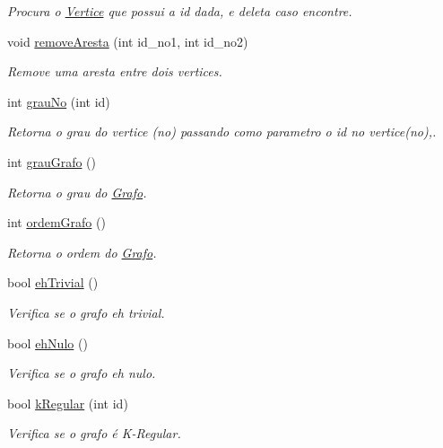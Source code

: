 \begin{DoxyCompactItemize}
\begin{DoxyCompactList}\small\item\em Procura o \hyperlink{class_vertice}{Vertice} que possui a id dada, e deleta caso encontre. \end{DoxyCompactList}\item 
void \hyperlink{class_grafo_ab3a5abe0a30afac753120ce1587f6f65}{remove\-Aresta} (int id\-\_\-no1, int id\-\_\-no2)
\begin{DoxyCompactList}\small\item\em Remove uma aresta entre dois vertices. \end{DoxyCompactList}\item 
int \hyperlink{class_grafo_a41ffeb7e79cf0d0c10297953f647c42d}{grau\-No} (int id)
\begin{DoxyCompactList}\small\item\em Retorna o grau do vertice (no) passando como parametro o id no vertice(no),. \end{DoxyCompactList}\item 
int \hyperlink{class_grafo_abada775efe72203e59e7930a095cbe95}{grau\-Grafo} ()
\begin{DoxyCompactList}\small\item\em Retorna o grau do \hyperlink{class_grafo}{Grafo}. \end{DoxyCompactList}\item 
int \hyperlink{class_grafo_ad954ce5924126084991e57a4e62a140f}{ordem\-Grafo} ()
\begin{DoxyCompactList}\small\item\em Retorna o ordem do \hyperlink{class_grafo}{Grafo}. \end{DoxyCompactList}\item 
bool \hyperlink{class_grafo_af70414fca091d884dd3d2656bdc790a9}{eh\-Trivial} ()
\begin{DoxyCompactList}\small\item\em Verifica se o grafo eh trivial. \end{DoxyCompactList}\item 
bool \hyperlink{class_grafo_a843e8d52e587e7564b4db61c8e3856e8}{eh\-Nulo} ()
\begin{DoxyCompactList}\small\item\em Verifica se o grafo eh nulo. \end{DoxyCompactList}\item 
bool \hyperlink{class_grafo_a8b8a37db83f48a3dba72ad5d68077ed7}{k\-Regular} (int id)
\begin{DoxyCompactList}\small\item\em Verifica se o grafo é K-\/\-Regular. \end{DoxyCompactList}\item 

\end{DoxyCompactItemize}
